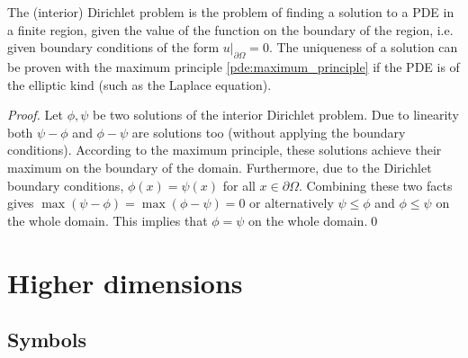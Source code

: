    The (interior) Dirichlet problem is the problem of finding a solution to a PDE in a finite region, given the value of the function on the boundary of the region, i.e. given boundary conditions of the form $u|_{\partial\Omega}=0$. The uniqueness of a solution can be proven with the maximum principle \ref{pde:maximum_principle} if the PDE is of the elliptic kind (such as the Laplace equation).
    \begin{proof}
        Let $\phi,\psi$ be two solutions of the interior Dirichlet problem. Due to linearity both $\psi-\phi$ and $\phi-\psi$ are solutions too (without applying the boundary conditions). According to the maximum principle, these solutions achieve their maximum on the boundary of the domain. Furthermore, due to the Dirichlet boundary conditions, $\phi(x)=\psi(x)$ for all $x\in\partial\Omega$. Combining these two facts gives $\max(\psi-\phi) = \max(\phi-\psi) = 0$ or alternatively $\psi\leq\phi$ and $\phi\leq\psi$ on the whole domain. This implies that $\phi=\psi$ on the whole domain.\qed
    \end{proof}



\section{Higher dimensions}\label{section:higher_dimensions}
\subsection{Symbols}


